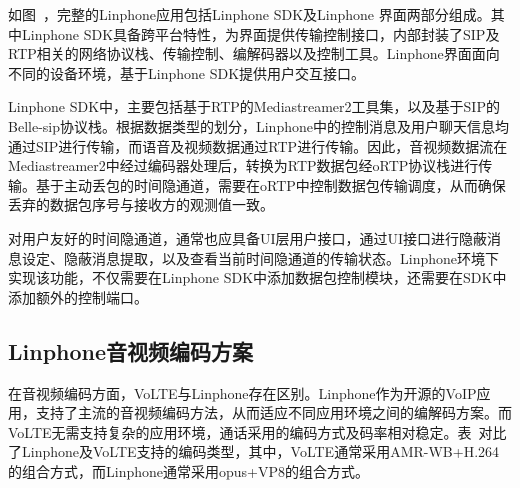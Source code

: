 如图\ ，完整的Linphone应用包括Linphone SDK及Linphone 界面两部分组成。其中Linphone SDK具备跨平台特性，为界面提供传输控制接口，内部封装了SIP及RTP相关的网络协议栈、传输控制、编解码器以及控制工具。Linphone界面面向不同的设备环境，基于Linphone SDK提供用户交互接口。

Linphone SDK中，主要包括基于RTP的Mediastreamer2工具集，以及基于SIP的Belle-sip协议栈。根据数据类型的划分，Linphone中的控制消息及用户聊天信息均通过SIP进行传输，而语音及视频数据通过RTP进行传输。因此，音视频数据流在Mediastreamer2中经过编码器处理后，转换为RTP数据包经oRTP协议栈进行传输。基于主动丢包的时间隐通道，需要在oRTP中控制数据包传输调度，从而确保丢弃的数据包序号与接收方的观测值一致。

对用户友好的时间隐通道，通常也应具备UI层用户接口，通过UI接口进行隐蔽消息设定、隐蔽消息提取，以及查看当前时间隐通道的传输状态。Linphone环境下实现该功能，不仅需要在Linphone SDK中添加数据包控制模块，还需要在SDK中添加额外的控制端口。

\subsection{Linphone音视频编码方案}
\label{chap:linphone:motivation:coding}


在音视频编码方面，VoLTE与Linphone存在区别。Linphone作为开源的VoIP应用，支持了主流的音视频编码方法，从而适应不同应用环境之间的编解码方案。而VoLTE无需支持复杂的应用环境，通话采用的编码方式及码率相对稳定。表\ 对比了Linphone及VoLTE支持的编码类型，其中，VoLTE通常采用AMR-WB+H.264的组合方式，而Linphone通常采用opus+VP8的组合方式。

